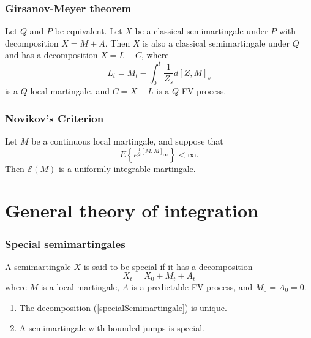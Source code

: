\begin{frame}
    \frametitle{Girsanov-Meyer theorem}
    
    Let $Q$ and $P$ be equivalent. Let $X$ be a classical semimartingale under $P$
    with decomposition $X=M+A$. Then $X$ is also a classical semimartingale under $Q$
    and has a decomposition $X=L+C$, where
    \begin{equation}
        L_t = M_t - \int_{0}^{t} \frac{1}{Z_s} d\left[ Z,M \right]_s
    \end{equation}
    is a $Q$ local martingale, and $C=X-L$ is a $Q$ FV process.

\end{frame}




\begin{frame}
    \frametitle{Novikov's Criterion}
    
    Let $M$ be a continuous local martingale, and suppose that
    \begin{equation}
        E\left\{ e^{\frac{1}{2}\left[ M,M \right]_\infty} \right\} < \infty.
    \end{equation}
    Then $\mathcal{E}\left( M \right)$ is a uniformly integrable martingale.
\end{frame}






\section{General theory of integration}

\begin{frame}
    \frametitle{Special semimartingales}
    
    A semimartingale $X$ is said to be special if it has a 
    decomposition 
    \begin{equation}
        X_t = X_0 + M_t + A_t
        \label{specialSemimartingale}
    \end{equation}
    where $M$ is a local martingale, $A$ is a predictable FV process, and $M_0=A_0=0$.

    \begin{enumerate}
        \item The decomposition (\ref{specialSemimartingale}) is unique.
        \item A semimartingale with bounded jumps is special.
    \end{enumerate}
\end{frame}


